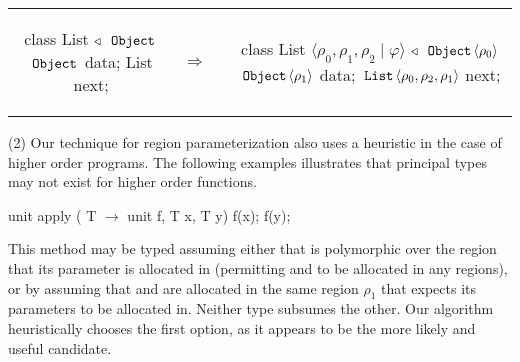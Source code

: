 \begin{tabular}{ccc}
\begin{minipage}{0.32\linewidth}
\begin{codejava}
class List $\triangleleft$ $\,{\tt Object}\,$
{
  $\,{\tt Object}\,$ data;
  List next;
}
\end{codejava}
\end{minipage}
&
$\Rightarrow  \; \; \;$
&
\begin{minipage}{0.65\linewidth}
\begin{codejava}
class List $\langle \rho_0, \rho_1, \rho_2 \; | \; \varphi \rangle$ $\triangleleft$ $\,{\tt Object}\, \langle \rho_0 \rangle$
{
  $\,{\tt Object}\, \langle \rho_1 \rangle$ data;
  $\,{\tt List}\, \langle \rho_0, \rho_2, \rho_1 \rangle$ next;
}
\end{codejava}
\end{minipage}
\end{tabular}

  (2) Our technique for region parameterization also uses a heuristic in the case of
higher order programs. The following examples illustrates that principal types may
not exist for higher order functions.
\begin{codejava}
    unit apply ( T $\rightarrow$ unit f, T x, T y) { f(x); f(y); }
\end{codejava}
This method may be typed assuming either that  is polymorphic over the region
that its parameter is allocated in (permitting  and  to be allocated in any
regions), or by assuming that  and  are allocated in the same region $\rho_1$
that  expects its parameters to be allocated in. Neither type subsumes the other.
Our algorithm heuristically chooses the first option, as it appears to be the more likely
and useful candidate.



